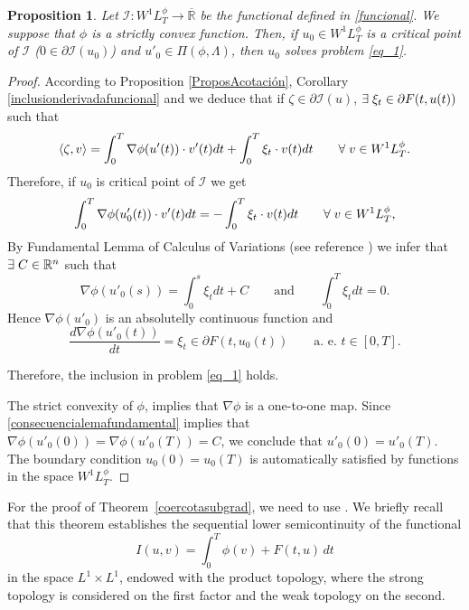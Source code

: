 \documentclass[twoside]{article}
\theoremstyle{definition}
\theoremstyle{plain}
\newtheorem{Propos}[definition]{Proposition}
\theoremstyle{remark}
\newcommand{\lphi}{L^{\phi}}
\newcommand{\wphit}{W^{1}\lphi_T}
\begin{document}
\begin{Propos}\label{teosolucion}
Let $\mathcal{I}:\wphit \to \overline{\mathbb{R}}$  be the functional defined in \eqref{funcional}. We suppose that $\phi$ is a strictly convex function. Then, if $u_0 \in \wphit$ is a critical point   of $\mathcal{I}$ ($0\in\partial\mathcal{I}(u_0)$) and $u'_0\in \Pi(\phi,\Lambda)$,  then $u_0$ solves problem \eqref{eq_1}.
\end{Propos}
\begin{proof}
According to Proposition \ref{ProposAcotación}, Corollary \ref{inclusionderivadafuncional} and \cite[Th. 10.13]{clarke2013functional} we deduce that if $\zeta \in \partial\mathcal{I}(u)$, $\exists \hspace{0,1cm} \xi_{t} \in \partial F(t,u(t))$ such that
\[\left<\zeta,v\right> =\int_0^T \nabla \phi(u'(t))\cdot v'(t)dt+\int_0^T\xi_{t} \cdot v(t) dt \qquad \forall \hspace{0,1cm} v \in \wphit.\]
Therefore, if $u_0$ is critical point of $\mathcal{I}$ we get
\[\int_0^T \nabla \phi(u'_0(t))\cdot v'(t)dt=-\int_0^T\xi_{t} \cdot v(t) dt \qquad \forall \hspace{0,1cm} v \in \wphit,\]
By Fundamental Lemma of Calculus of Variations (see reference \cite{mawhin2010critical}) we infer that $\exists \hspace{0,1cm} C\in \mathbb{R}^n$ such that
\begin{equation}\label{consecuencialemafundamental}
 \nabla \phi(u'_0(s))=\int_0^s \xi_t dt + C \qquad\text{and} \qquad \int_0^T \xi_t dt = 0.
\end{equation}
Hence $\nabla \phi(u'_0)$ is an absolutelly continuous function and
\[\frac{d\nabla \phi(u'_0(t))}{dt}=\xi_t \in \partial F(t,u_0(t)) \qquad \text{a. e. } t\in [0,T].\]

Therefore, the inclusion in problem \eqref{eq_1} holds.

The strict convexity of $\phi$, implies that $\nabla \phi$ is a one-to-one map. Since \eqref{consecuencialemafundamental} implies that $\nabla \phi(u'_0(0))=\nabla \phi(u'_0(T))=C$, we conclude that $u'_0(0)=u'_0(T)$. The boundary condition $u_0(0)=u_0(T)$ is automatically satisfied by functions in the space $\wphit$.
\end{proof}



For the proof of Theorem~\ref{coercotasubgrad}, we need to use \cite[Th.~3.6]{buttazzo1998one}. We briefly recall that this theorem establishes the sequential lower semicontinuity of the functional
\[
I(u,v) = \int_0^T \phi(v) + F(t,u) \, dt
\]
in the space $ L^1 \times L^1 $, endowed with the product topology, where the strong topology is considered on the first factor and the weak topology on the second.
\end{document}
